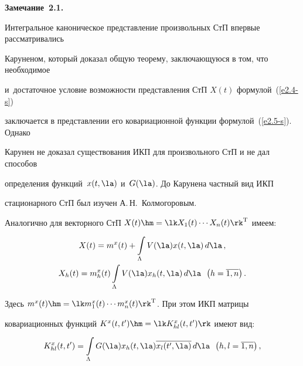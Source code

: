 \noindent

\textbf{Замечание~2.1.}

Интегральное каноническое представление произвольных СтП впервые рассматривались 

Каруненом, который доказал  общую теорему, заключающуюся в том, что необходимое 

и~достаточное условие возможности представления СтП $X(t)$ формулой~(\ref{e2.4-s}) 

заключается в представлении его ковариационной функции формулой~(\ref{e2.5-s}). Однако 

Карунен не доказал существования ИКП для произвольного СтП и не дал способов 

определения функций~$x(t,\la)$ и~$G(\la)$. До Карунена частный вид ИКП 

стационарного СтП был изучен А.\,Н.~Колмогоровым.



\smallskip



Аналогично для векторного СтП $X(t) \hm=\lk X_1(t) \cdots X_n(t)\rk^{\mathrm{T}}$ имеем:



\vspace*{-6pt}



\noindent

  \begin{multline}

    X(t) = m^x (t) + \displaystyle \int\limits_\Lambda V(\la) x (t,\la)\, d\la\,,\\

    X_h(t) = m_h^x (t) \displaystyle \int\limits_\Lambda V(\la) x_h (t,\la)\, d\la\enskip 

\left(h=\overline{1,n}\right).

         \label{e2.12-s}

     \end{multline}

     

     \pagebreak



\noindent

Здесь $m^x (t) \hm= \lk m_1^x (t) \cdots m_n^x (t)\rk^{\mathrm{T}}$. При этом ИКП матрицы 

ковариационных функций $K^x (t, t') \hm= \lk K_{hl}^x (t,t')\rk$ имеют вид:

    \begin{equation}

    K_{hl}^x (t,t') = \int\limits_\Lambda G(\la) x_h (t,\la) \overline{x_l(t',\la)} \,

d\la \enskip \left(h,l=\overline{1,n}\right),

\label{e2.13-s}

\end{equation}

